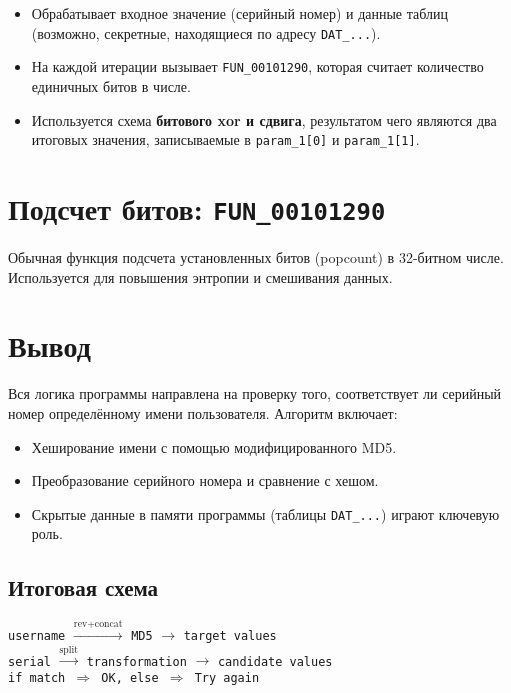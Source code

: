     \begin{itemize}
        \item Обрабатывает входное значение (серийный номер) и данные таблиц (возможно, секретные, находящиеся по адресу \texttt{DAT\_...}).
        \item На каждой итерации вызывает \texttt{FUN\_00101290}, которая считает количество единичных битов в числе.
        \item Используется схема \textbf{битового xor и сдвига}, результатом чего являются два итоговых значения, записываемые в \texttt{param\_1[0]} и \texttt{param\_1[1]}.
    \end{itemize}


    \section{Подсчет битов: \texttt{FUN\_00101290}}

    Обычная функция подсчета установленных битов (popcount) в 32-битном числе.
    Используется для повышения энтропии и смешивания данных.


    \section{Вывод}

    Вся логика программы направлена на проверку того, соответствует ли серийный номер определённому имени пользователя.
    Алгоритм включает:

    \begin{itemize}
        \item Хеширование имени с помощью модифицированного MD5.
        \item Преобразование серийного номера и сравнение с хешом.
        \item Скрытые данные в памяти программы (таблицы \texttt{DAT\_...}) играют ключевую роль.
    \end{itemize}

    \subsection*{Итоговая схема}

    \begin{center}
        \texttt{username} $\xrightarrow{\text{rev+concat}}$ \texttt{MD5} $\rightarrow$ \texttt{target values} \\
        \texttt{serial} $\xrightarrow{\text{split}}$ \texttt{transformation} $\rightarrow$ \texttt{candidate values} \\
        \texttt{if match $\Rightarrow$ OK, else $\Rightarrow$ Try again}
    \end{center}
